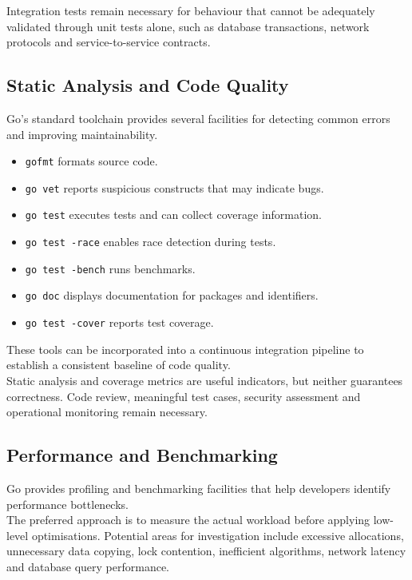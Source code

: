 Integration tests remain necessary for behaviour that cannot be adequately validated through unit tests alone, such as database transactions, network protocols and service-to-service contracts.\\

\subsection{Static Analysis and Code Quality}

Go's standard toolchain provides several facilities for detecting common errors and improving maintainability.

\begin{itemize}
    \item \texttt{gofmt} formats source code.
    \item \texttt{go vet} reports suspicious constructs that may indicate bugs.
    \item \texttt{go test} executes tests and can collect coverage information.
    \item \texttt{go test -race} enables race detection during tests.
    \item \texttt{go test -bench} runs benchmarks.
    \item \texttt{go doc} displays documentation for packages and identifiers.
    \item \texttt{go test -cover} reports test coverage.
\end{itemize}

These tools can be incorporated into a continuous integration pipeline to establish a consistent baseline of code quality.\\

Static analysis and coverage metrics are useful indicators, but neither guarantees correctness. Code review, meaningful test cases, security assessment and operational monitoring remain necessary.

\subsection{Performance and Benchmarking}

Go provides profiling and benchmarking facilities that help developers identify performance bottlenecks.\\

The preferred approach is to measure the actual workload before applying low-level optimisations. Potential areas for investigation include excessive allocations, unnecessary data copying, lock contention, inefficient algorithms, network latency and database query performance.\\

